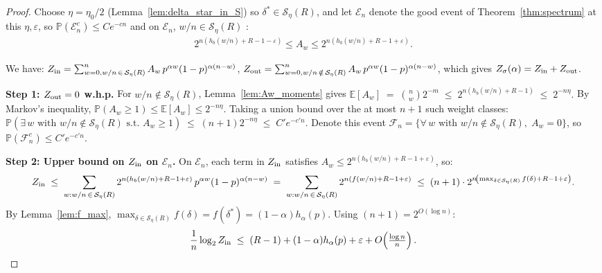 \documentclass[journal,10pt,onecolumn]{IEEEtran}
\newcommand{\Eb}{\mathbb{E}}
\newcommand{\Pb}{\mathbb{P}}
\newcommand{\Hb}{h_b}
\newcommand{\Seta}{\mathcal{S}}
\begin{document}
\begin{proof}
Choose $\eta=\eta_0/2$ (Lemma~\ref{lem:delta_star_in_S}) so
$\delta^*\in\Seta_\eta(R)$, and let $\mathcal{E}_n$ denote the
good event of Theorem~\ref{thm:spectrum} at this $\eta,\varepsilon$,
so $\Pb(\mathcal{E}_n^c)\le Ce^{-cn}$ and on $\mathcal{E}_n$, \(w/n\in\Seta_\eta(R)\) :
\begin{align}
    2^{n(\Hb(w/n)+R-1-\varepsilon)}\le A_w\le
    2^{n(\Hb(w/n)+R-1+\varepsilon)}.
    \label{eq:spectrum_event}
\end{align}

We have: 
\(Z_{\rm in}=\sum_{\substack{w=0, w/n\,\in\,\Seta_\eta(R)}}^n
        A_w\,p^{\alpha w}(1-p)^{\alpha(n-w)}\),
 \(Z_{\rm out}=\sum_{\substack{w=0, w/n\,\notin\,\Seta_\eta(R)}}^n
        A_w\,p^{\alpha w}(1-p)^{\alpha(n-w)}\), which gives
\(Z_\sigma(\alpha)=Z_{\rm in}+Z_{\rm out}\).

 
\noindent\textbf{Step 1: $Z_{\rm out}=0$ w.h.p.}
For $w/n\notin\Seta_\eta(R)$, Lemma~\ref{lem:Aw_moments} gives
\(
    \Eb[A_w]
    \;=\;
    \binom{n}{w}2^{-m}
    \;\le\;
    2^{n(\Hb(w/n)+R-1)}
    \;\le\;
    2^{-n\eta}.
\)
By Markov's inequality, $\Pb(A_w\ge 1)\le\Eb[A_w]\le 2^{-n\eta}$.
Taking a union bound over the at most $n+1$ such weight classes:
\(
    \Pb\!\left(\exists\,w\text{ with }w/n\notin\Seta_\eta(R)
    \text{ s.t.\ }A_w\ge 1\right)
    \;\le\;
    (n+1)2^{-n\eta}
    \;\le\;
    C'e^{-c'n}.
\)
Denote this event
$\mathcal{F}_n=\{\forall\, w \text{ with }
w/n\notin\Seta_\eta(R),\; A_w=0\}$,
so $\Pb(\mathcal{F}_n^c)\le C'e^{-c'n}$.
 
\noindent\textbf{Step 2: Upper bound on $Z_{\rm in}$ on $\mathcal{E}_n$.}
On $\mathcal{E}_n$, each term in $Z_{\rm in}$ satisfies
$A_w\le 2^{n(\Hb(w/n)+R-1+\varepsilon)}$, so:
\[
    Z_{\rm in}
    \;\le\;
    \sum_{\substack{w:w/n\,\in\,\Seta_\eta(R)}}
    2^{n(\Hb(w/n)+R-1+\varepsilon)}\,p^{\alpha w}(1-p)^{\alpha(n-w)}
    \;=\;
    \sum_{\substack{w:w/n\,\in\,\Seta_\eta(R)}}
    2^{n(f(w/n)+R-1+\varepsilon)} 
    \;\le\;
    (n+1)\cdot
    2^{n\!\left(\max_{\delta\in\Seta_\eta(R)}f(\delta)+R-1+\varepsilon\right)}.
\]
By Lemma~\ref{lem:f_max},
$\max_{\delta\in\Seta_\eta(R)}f(\delta)=f(\delta^*)=(1-\alpha)h_\alpha(p)$.
Using $(n+1)=2^{O(\log n)}$:
\begin{equation}
    \frac{1}{n}\log_2 Z_{\rm in}
    \;\le\;
    (R-1)+(1-\alpha)h_\alpha(p)+\varepsilon+O\!\left(\tfrac{\log n}{n}\right).
    \label{eq:upper_final}
\end{equation}


\end{proof}
\end{document}
